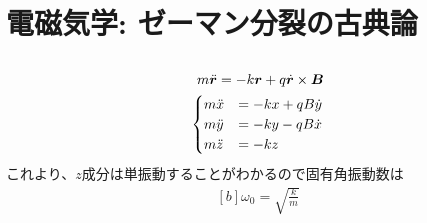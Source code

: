 \documentclass[../ap_2011.tex]{subfiles}
\begin{document}
\setcounter{chapter}{2}
\chapter{電磁気学: ゼーマン分裂の古典論}
\section{}
\begin{equation}\begin{aligned}[b]
    m\ddot{\vb*{r}} = -k\vb*{r}+q\dot{\vb*{r}}\times \vb*{B}\\
    \begin{cases}
        m\ddot{x} &= -kx +qB\dot{y}\\
        m\ddot{y} &= -ky -qB\dot{x}\\
        m\ddot{z} &= -kz
    \end{cases}
\end{aligned}\end{equation}
これより、\(z\)成分は単振動することがわかるので固有角振動数は
\begin{equation}\begin{aligned}[b]
    \omega_0 = \sqrt{\frac{k}{m}}
\end{aligned}\end{equation}
\end{document}
